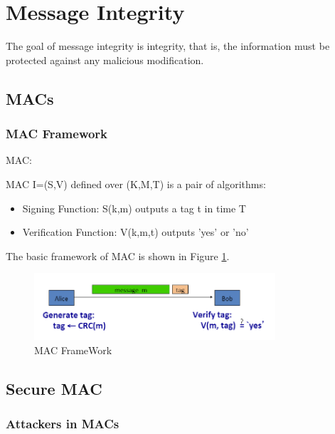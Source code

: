 
\section{Message Integrity}

The goal of message integrity is integrity, that is, the information must be protected against any malicious modification.

\subsection{MACs}

\subsubsection{MAC Framework}

\begin{definition}[MAC] MAC:

    MAC I=(S,V) defined over (K,M,T) is a pair of algorithms:
    \begin{itemize} [itemsep=2pt,topsep=0pt,parsep=0pt]
        \item Signing Function: S(k,m) outputs a tag t in time T
        \item Verification Function: V(k,m,t) outputs 'yes' or 'no'
    \end{itemize}
    
\end{definition}

The basic framework of MAC is shown in Figure \ref{fig: Lecture 4: MAC FrameWork}.

\begin{figure}[h]
    \centering
    \includegraphics[width=0.8\textwidth]{Stanford_Crypto_1/fig/04_Integrity/MAC Frame Work.png}
    \caption{MAC FrameWork}
    \label{fig: Lecture 4: MAC FrameWork}
\end{figure}


\subsection{Secure MAC}

\subsubsection{Attackers in MACs}

